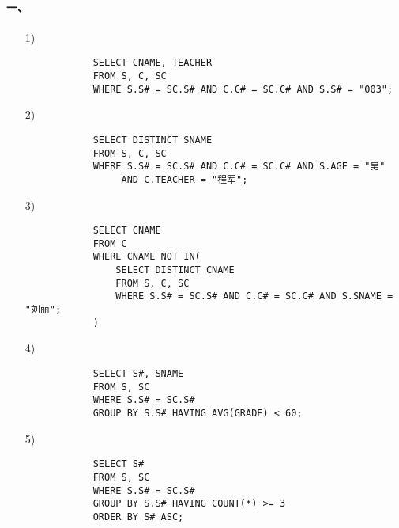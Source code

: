 \documentclass[10pt,a4paper]{article}
\begin{document}
	\pagestyle{main}    %
	
	\setlength{\parskip}{0pt}
	\renewcommand{\baselinestretch}{1.5}
	
    \paragraph{一、}
    \begin{enumerate}
        \item[1)] 
        \begin{verbatim}
            SELECT CNAME, TEACHER
            FROM S, C, SC
            WHERE S.S# = SC.S# AND C.C# = SC.C# AND S.S# = "003";
        \end{verbatim}
        \item[2)]\begin{verbatim}
            SELECT DISTINCT SNAME
            FROM S, C, SC
            WHERE S.S# = SC.S# AND C.C# = SC.C# AND S.AGE = "男"
                 AND C.TEACHER = "程军";
        \end{verbatim}
        \item[3)]\begin{verbatim}
            SELECT CNAME
            FROM C
            WHERE CNAME NOT IN(
                SELECT DISTINCT CNAME
                FROM S, C, SC
                WHERE S.S# = SC.S# AND C.C# = SC.C# AND S.SNAME = "刘丽";
            )
        \end{verbatim}
        \item[4)]\begin{verbatim}
            SELECT S#, SNAME
            FROM S, SC
            WHERE S.S# = SC.S#
            GROUP BY S.S# HAVING AVG(GRADE) < 60;
        \end{verbatim}
        \item[5)]\begin{verbatim}
            SELECT S#
            FROM S, SC
            WHERE S.S# = SC.S#
            GROUP BY S.S# HAVING COUNT(*) >= 3
            ORDER BY S# ASC;
        \end{verbatim}
    \end{enumerate}
    
\end{document}
